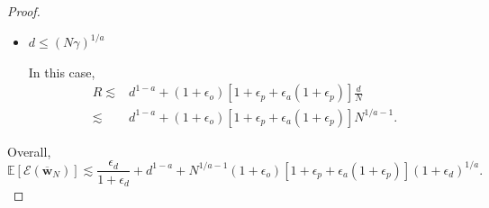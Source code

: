 \documentclass[11pt, letterpaper]{article}
\begin{document}
\begin{proof}
\begin{itemize}[leftmargin=*,nosep]
        In this case,
        \begin{equation*}
            \begin{aligned}
                R\lesssim& (N\gamma)^{1/a-1}+(1+\epsilon_o) [1+\epsilon_p+\epsilon_a(1+\epsilon_p)]\frac{d}{N}\\
                \lesssim& (N\gamma)^{1/a-1}+(1+\epsilon_o) [1+\epsilon_p+\epsilon_a(1+\epsilon_p)]\frac{\left[N\gamma (1+\epsilon_d)\right]^{\frac{1}{a}}}{N}\\
                \lesssim&N^{1/a-1}(1+\epsilon_o) [1+\epsilon_p+\epsilon_a(1+\epsilon_p)](1+\epsilon_d)^{1/a}.
            \end{aligned}
        \end{equation*}
        \item $d\leq (N\gamma)^{1/a}$

        In this case,
        \begin{equation*}
            \begin{aligned}
                R\lesssim& d^{1-a}+(1+\epsilon_o) [1+\epsilon_p+\epsilon_a(1+\epsilon_p)]\frac{d}{N}\\
                \lesssim&d^{1-a}+(1+\epsilon_o) [1+\epsilon_p+\epsilon_a(1+\epsilon_p)]N^{1/a-1}.
            \end{aligned}
        \end{equation*}
    \end{itemize}
    Overall,
    \begin{equation*}
        \mathbb{E}\left[\mathcal{E}(\overline{\mathbf{w}}_N)\right]\lesssim\frac{\epsilon_d}{1+\epsilon_d}+d^{1-a}+N^{1/a-1}(1+\epsilon_o) [1+\epsilon_p+\epsilon_a(1+\epsilon_p)](1+\epsilon_d)^{1/a}.
    \end{equation*}
\end{proof}
\end{document}
